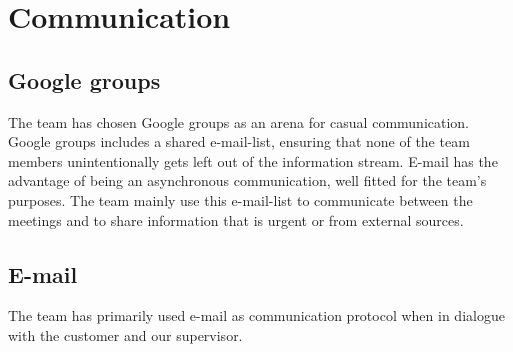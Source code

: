 \section{Communication}
\subsection{Google groups}
The team has chosen Google groups as an arena for casual communication. Google groups includes a shared e-mail-list, ensuring that none of the team members unintentionally gets left out of the information stream. E-mail has the advantage of being an asynchronous communication, well fitted for the team's purposes. The team mainly use this e-mail-list to communicate between the meetings and to share information that is urgent or from external sources. 

\subsection{E-mail}
The team has primarily used e-mail as communication protocol when in dialogue with the customer and our supervisor.